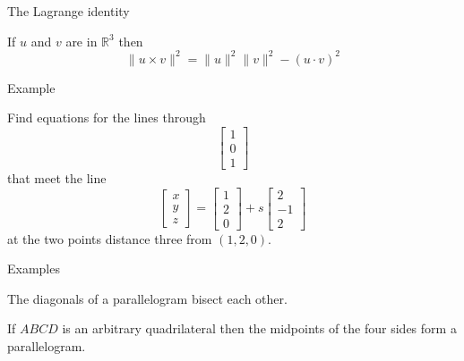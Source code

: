 \documentclass{beamer}
\begin{document}
\begin{frame}{The Lagrange identity}
\begin{theorem}
If $u$ and $v$ are in $\mathbb{R}^3$ then
\begin{equation*}
\|u\times v\|^2 = \|u\|^2\|v\|^2-(u\cdot v)^2
\end{equation*}
\end{theorem}
\end{frame}

\begin{frame}{Example}
    \begin{example}
        Find equations for the lines through
        \begin{equation*}
            \left[
            \begin{array}{c}
            1\\
            0\\
            1
            \end{array}
            \right]
        \end{equation*}
        that meet the line
        \begin{equation*}
            \left[
            \begin{array}{c}
            x\\
            y\\
            z
            \end{array}
            \right] = \left[
            \begin{array}{c}
            1\\
            2\\
            0
            \end{array}
            \right]+s \left[
            \begin{array}{c}
            2\\
            -1\\
            2
            \end{array}
            \right]
        \end{equation*}
        at the two points distance three from $(1, 2, 0)$.
    \end{example}
\end{frame}

\begin{frame}{Examples}
    \begin{example}
        The diagonals of a parallelogram bisect each other.
      \end{example}
      \begin{example}
        If $ABCD$ is an arbitrary quadrilateral then the midpoints of the four sides form a parallelogram.
      \end{example}
\end{frame}
\end{document}
